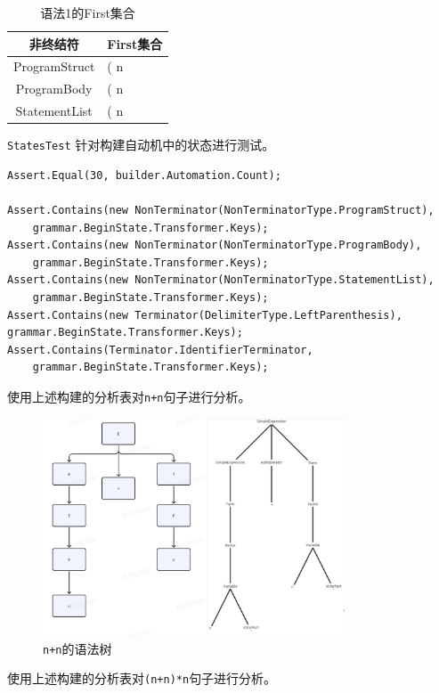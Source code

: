 \documentclass[../main.tex]{subfiles}
\begin{document}
\begin{table}[h]
    \centering
    \begin{tabular}{|c|p{10cm}|}
    \hline
    \textbf{非终结符} & \textbf{First集合} \\
    \hline
    ProgramStruct & ( n \\
    \hline
    ProgramBody & ( n \\
    \hline
    StatementList & ( n \\
    \hline
    \end{tabular}
    \caption{语法1的First集合}
    \label{tab:grammar_1_first}
\end{table}

\texttt{StatesTest} 针对构建自动机中的状态进行测试。

\begin{lstlisting}[style=csharp]
Assert.Equal(30, builder.Automation.Count);

Assert.Contains(new NonTerminator(NonTerminatorType.ProgramStruct), 
    grammar.BeginState.Transformer.Keys);
Assert.Contains(new NonTerminator(NonTerminatorType.ProgramBody), 
    grammar.BeginState.Transformer.Keys);
Assert.Contains(new NonTerminator(NonTerminatorType.StatementList),
    grammar.BeginState.Transformer.Keys);
Assert.Contains(new Terminator(DelimiterType.LeftParenthesis), grammar.BeginState.Transformer.Keys);
Assert.Contains(Terminator.IdentifierTerminator,        
    grammar.BeginState.Transformer.Keys);
\end{lstlisting}
\clearpage
使用上述构建的分析表对\texttt{n+n}句子进行分析。

\begin{figure}[H]
    \centering
    \includegraphics[width=0.8\textwidth]{assets/测试/n+n语法树.jpg}
    \caption{\texttt{n+n}的语法树}
    \label{fig:grammar_1_tree_1}
\end{figure}
\clearpage
使用上述构建的分析表对\texttt{(n+n)*n}句子进行分析。
\end{document}

